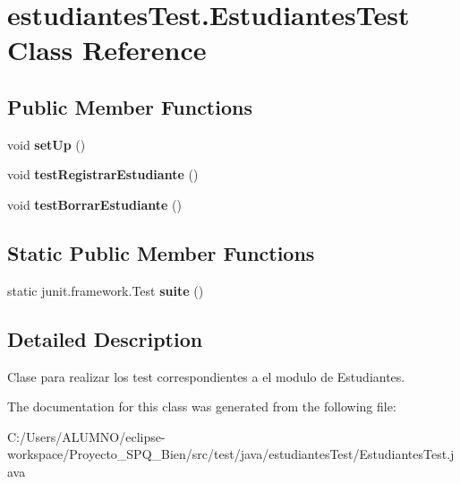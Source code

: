 \hypertarget{classestudiantes_test_1_1_estudiantes_test}{}\section{estudiantes\+Test.\+Estudiantes\+Test Class Reference}
\label{classestudiantes_test_1_1_estudiantes_test}
\subsection*{Public Member Functions}
\begin{DoxyCompactItemize}
\item 
\mbox{\label{classestudiantes_test_1_1_estudiantes_test_aed8cc18a55f49fbd129015306a5e425a}} 
void {\bfseries set\+Up} ()
\item 
\mbox{\label{classestudiantes_test_1_1_estudiantes_test_a87cad39ec43030831bf9c902aaf8f81d}} 
void {\bfseries test\+Registrar\+Estudiante} ()
\item 
\mbox{\label{classestudiantes_test_1_1_estudiantes_test_aabb95c69f78ba3fde981360f620e50df}} 
void {\bfseries test\+Borrar\+Estudiante} ()
\end{DoxyCompactItemize}
\subsection*{Static Public Member Functions}
\begin{DoxyCompactItemize}
\item 
\mbox{\label{classestudiantes_test_1_1_estudiantes_test_a0bb964e537c2b44a377f2c4bed80d143}} 
static junit.\+framework.\+Test {\bfseries suite} ()
\end{DoxyCompactItemize}


\subsection{Detailed Description}
Clase para realizar los test correspondientes a el modulo de Estudiantes. 

The documentation for this class was generated from the following file\+:\begin{DoxyCompactItemize}
\item 
C\+:/\+Users/\+A\+L\+U\+M\+N\+O/eclipse-\/workspace/\+Proyecto\+\_\+\+S\+P\+Q\+\_\+Bien/src/test/java/estudiantes\+Test/Estudiantes\+Test.\+java\end{DoxyCompactItemize}
